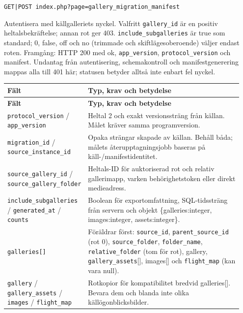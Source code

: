 \documentclass[11pt,a4paper]{article}
\newcommand{\codeword}[1]{\nolinkurl{#1}}
\begin{document}
\label{api352:migration-manifest}

\begin{lstlisting}[language={}]
GET|POST index.php?page=gallery_migration_manifest
\end{lstlisting}

Autentisera med källgalleriets nyckel. Valfritt \codeword{gallery_id} är en positiv
heltalsbekräftelse; annan rot ger 403. \codeword{include_subgalleries} är true som standard;
0, false, off och no (trimmade och skiftlägesoberoende) väljer endast roten. Framgång: HTTP
200 med ok, \codeword{app_version}, \codeword{protocol_version} och manifest. Undantag från
autentisering, schemakontroll och manifestgenerering mappas alla till 401 här; statusen
betyder alltså inte enbart fel nyckel.

\begin{longtable}{@{}>{\RaggedRight\arraybackslash}p{0.28\linewidth}>{\RaggedRight\arraybackslash}p{0.67\linewidth}@{}}
\toprule
\textbf{Fält} & \textbf{Typ, krav och betydelse} \\
\midrule
\endfirsthead
\toprule
\textbf{Fält} & \textbf{Typ, krav och betydelse} \\
\midrule
\endhead
\bottomrule
\endfoot
\codeword{protocol_version} / \codeword{app_version} & Heltal 2 och exakt versionssträng
från källan. Målet kräver samma programversion. \\
\codeword{migration_id} / \codeword{source_instance_id} & Opaka strängar skapade av källan.
Behåll båda; målets återupptagningsjobb baseras på käll-/manifestidentitet. \\
\codeword{source_gallery_id} / \codeword{source_gallery_folder} & Heltals-ID för
auktoriserad rot och relativ gallerimapp, varken behörighetstoken eller direkt medieadress.
\\
\codeword{include_subgalleries} / \codeword{generated_at} / \codeword{counts} & Boolean för
exportomfattning, SQL-tidssträng från servern och objekt \{galleries:integer,
images:integer, assets:integer\}. \\
\codeword{galleries[]} & Föräldrar först: \codeword{source_id}, \codeword{parent_source_id}
(rot 0), \codeword{source_folder}, \codeword{folder_name}, \codeword{relative_folder} (tom
för rot), gallery, \codeword{gallery_assets}[], images[] och \codeword{flight_map} (kan vara
null). \\
\codeword{gallery} / \codeword{gallery_assets} / \codeword{images} / \codeword{flight_map} &
Rotkopior för kompatibilitet bredvid galleries[]. Bevara dem och blanda inte olika
källögonblicksbilder. \\
\end{longtable}
\end{document}
